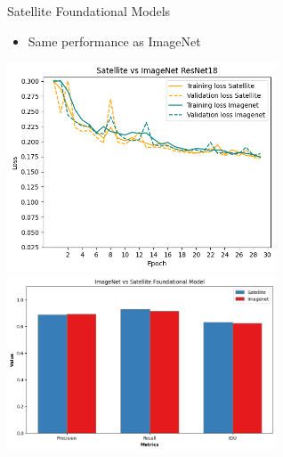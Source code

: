 
\begin{frame}{Satellite Foundational Models}
    \centering
    \begin{itemize}
        \item Same performance as ImageNet
    \end{itemize}  
    \includegraphics[height=0.6\textheight,width=0.6\textwidth,keepaspectratio]{images/mm_sat_imagenet_loss.png}
    \includegraphics[height=0.6\textheight,width=0.6\textwidth,keepaspectratio]{images/mm_sat_imagenet_performance.png}
\end{frame}

